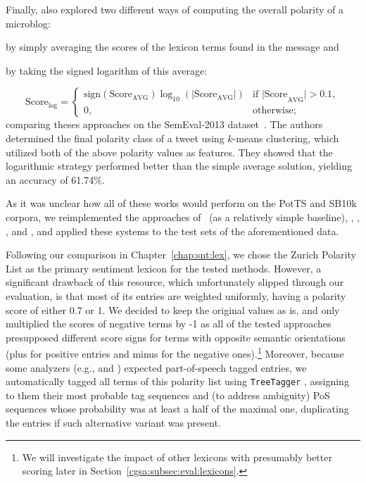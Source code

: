 Finally, \citet{Kolchyna:15} also explored two different ways of
computing the overall polarity of a microblog:
\begin{inparaenum}[(i)]
\item by simply averaging the scores of the lexicon terms found in the
  message and
\item by taking the signed logarithm of this average:
\end{inparaenum}
\begin{equation*}
  \text{Score}_{\log} =
  \begin{cases}
    \text{sign}(\text{Score}_{\text{AVG}})\log_{10}(|\text{Score}_{\text{AVG}}|) & %
    \text{if |Score}_{\text{AVG}}| > 0.1,\\
    0, & \text{otherwise};
  \end{cases}
\end{equation*}%
comparing theses approaches on the SemEval-2013
dataset~\cite{Nakov:13}.  The authors determined the final polarity
class of a tweet using $k$-means clustering, which utilized both of
the above polarity values as features.  They showed that the
logarithmic strategy performed better than the simple average
solution, yielding an accuracy of 61.74\%.  %

As it was unclear how all of these works would perform on the PotTS
and SB10k corpora, we reimplemented the approaches of~\citet{Hu:04}
(as a relatively simple baseline), \citet{Taboada:11},
\citet{Musto:14}, \citet{Jurek:15}, and \citet{Kolchyna:15}, and
applied these systems to the test sets of the aforementioned data.

Following our comparison in Chapter~\ref{chap:snt:lex}, we chose the
Zurich Polarity List as the primary sentiment lexicon for the tested
methods.  However, a significant drawback of this resource, which
unfortunately slipped through our evaluation, is that most of its
entries are weighted uniformly, having a polarity score of either 0.7
or 1.  We decided to keep the original values as is, and only
multiplied the scores of negative terms by -1 as all of the tested
approaches presupposed different score signs for terms with opposite
semantic orientations (plus for positive entries and minus for the
negative ones).\footnote{We will investigate the impact of other
  lexicons with presumably better scoring later in
  Section~\ref{cgsa:subsec:eval:lexicons}.}  Moreover, because some
analyzers (e.g., \citet{Taboada:11} and \citet{Musto:14}) expected
part-of-speech tagged entries, we automatically tagged all terms of
this polarity list using \texttt{TreeTagger} \cite{Schmid:95},
assigning to them their most probable tag sequences and (to address
ambiguity) PoS sequences whose probability was at least a half of the
maximal one, duplicating the entries if such alternative variant was
present.

